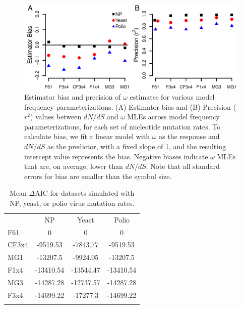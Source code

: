 \documentclass[11pt]{article}
\begin{document}
\begin{figure}[htbp]
	\centerline{\includegraphics[width=12cm]{figures/MainText/nyp_bias_r2.pdf}}
	\caption{\label{nyp_bias_r2} Estimator bias and precision of $\omega$ estimates for various model frequency parameterizations. (A) Estimator bias and (B) Precision ($r^2$) values between $dN/dS$ and $\omega$ MLEs across model frequency parameterizations, for each set of nucleotide mutation rates. To calculate bias, we fit a linear model with $\omega$ as the response and $dN/dS$ as the predictor, with a fixed slope of 1, and the resulting intercept value represents the bias. Negative biases indicate $\omega$ MLEs that are, on average, lower than $dN/dS$. Note that all standard errors for bias are smaller than the symbol size.}	
\end{figure}

\vspace{2cm}


\begin{table}[htbp]
	\caption {\label{tab:dAIC} Mean $\Delta$AIC for datasets simulated with NP, yeast, or polio virus mutation rates.}
	\begin{tabular}{l c c c}
		\hline\noalign{\smallskip}
		\multicolumn{1}{c}{Frequencies} & NP & Yeast & Polio \\
		\noalign{\smallskip}\hline\noalign{\smallskip}
		F61 & 0 & 0 & 0 \\ 
		CF3x4 & -9519.53 & -7843.77 & -9519.53 \\ 
		MG1 & -13207.5 & -9924.05 & -13207.5 \\ 
		F1x4 & -13410.54 & -13544.47 & -13410.54 \\ 
		MG3 & -14287.28 & -12737.57 & -14287.28 \\ 
		F3x4 & -14699.22 & -17277.3 & -14699.22 \\ 
		\noalign{\smallskip}\hline\noalign{\smallskip} 	
	\end{tabular}

\end{table}
\end{document}
